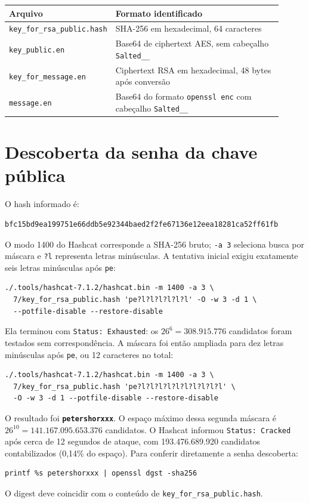 \documentclass[11pt,a4paper]{article}
\newcommand{\code}[1]{\texttt{#1}}
\begin{document}
\begin{center}
\begin{tabular}{p{0.30\linewidth}p{0.61\linewidth}}
\toprule
Arquivo & Formato identificado \\
\midrule
\code{key\_for\_rsa\_public.hash} & SHA-256 em hexadecimal, 64 caracteres \\
\code{key\_public.en} & Base64 de ciphertext AES, sem cabeçalho \code{Salted\_\_} \\
\code{key\_for\_message.en} & Ciphertext RSA em hexadecimal, 48 bytes após conversão \\
\code{message.en} & Base64 do formato \code{openssl enc} com cabeçalho \code{Salted\_\_} \\
\bottomrule
\end{tabular}
\end{center}

\section{Descoberta da senha da chave pública}

O hash informado é:
\begin{Verbatim}[fontsize=\scriptsize]
bfc15bd9ea199751e66ddb5e92344baed2f2fe67136e12eea18281ca52ff61fb
\end{Verbatim}

O modo 1400 do Hashcat corresponde a SHA-256 bruto; \code{-a 3} seleciona busca por máscara e \code{?l} representa letras minúsculas. A tentativa inicial exigiu exatamente seis letras minúsculas após \code{pe}:
\begin{Verbatim}[fontsize=\scriptsize]
./.tools/hashcat-7.1.2/hashcat.bin -m 1400 -a 3 \
  7/key_for_rsa_public.hash 'pe?l?l?l?l?l?l' -O -w 3 -d 1 \
  --potfile-disable --restore-disable
\end{Verbatim}
Ela terminou com \code{Status: Exhausted}: os $26^6=308.915.776$ candidatos foram testados sem correspondência. A máscara foi então ampliada para dez letras minúsculas após \code{pe}, ou 12 caracteres no total:
\begin{Verbatim}[fontsize=\scriptsize]
./.tools/hashcat-7.1.2/hashcat.bin -m 1400 -a 3 \
  7/key_for_rsa_public.hash 'pe?l?l?l?l?l?l?l?l?l?l' \
  -O -w 3 -d 1 --potfile-disable --restore-disable
\end{Verbatim}
O resultado foi \textbf{\code{petershorxxx}}. O espaço máximo dessa segunda máscara é $26^{10}=141.167.095.653.376$ candidatos. O Hashcat informou \code{Status: Cracked} após cerca de 12 segundos de ataque, com 193.476.689.920 candidatos contabilizados (0,14\% do espaço). Para conferir diretamente a senha descoberta:
\begin{Verbatim}[fontsize=\scriptsize]
printf %s petershorxxx | openssl dgst -sha256
\end{Verbatim}
O digest deve coincidir com o conteúdo de \code{key\_for\_rsa\_public.hash}.
\end{document}
